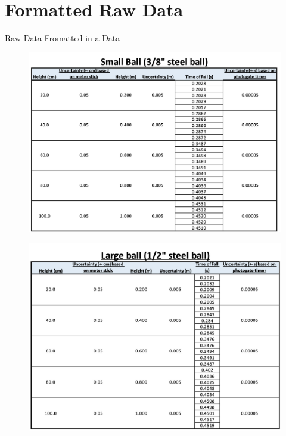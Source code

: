 \section{Formatted Raw Data}
Raw Data Fromatted in a Data

\begin{figure}[ht!]
    \includegraphics[scale=0.3]{resources/RawDataTableSmall.jpg}
\end{figure}

\begin{figure}[ht!]
    \includegraphics[scale=0.4]{resources/RawDataTableLarge.jpg}
\end{figure}
